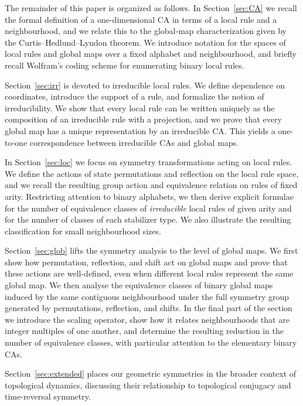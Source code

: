\documentclass[a4paper]{article}
\begin{document}
The remainder of this paper is organized as follows.
In Section~\ref{sec:CA} we recall the formal definition of a one-dimensional CA in terms of
a local rule and a neighbourhood, and we relate this to the global-map
characterization given by the Curtis--Hedlund--Lyndon theorem. We introduce
notation for the spaces of local rules and global maps over a fixed alphabet and
neighbourhood, and briefly recall Wolfram's coding scheme for enumerating
binary local rules.

Section~\ref{sec:irr} is devoted to irreducible local rules. We define dependence on
coordinates, introduce the support of a rule, and formalize the notion of
irreducibility. We show that every local rule can be written uniquely as the
composition of an irreducible rule with a projection, and we prove that every
global map has a unique representation by an irreducible CA. This yields a
one-to-one correspondence between irreducible CAs and global maps.

In Section~\ref{sec:loc} we focus on symmetry transformations acting on local rules. We
define the actions of state permutations and reflection on the local rule space,
and we recall the resulting group action and equivalence relation on rules of
fixed arity. Restricting attention to binary alphabets, we then derive explicit
formulae for the number of equivalence classes of \emph{irreducible} local rules
of given arity and for the number of classes of each stabilizer type. We also
illustrate the resulting classification for small neighbourhood sizes.

Section~\ref{sec:glob} lifts the symmetry analysis to the level of global maps. We first show
how permutation, reflection, and shift act on global maps and prove that these
actions are well-defined, even when different local rules represent the same
global map. We then analyse the equivalence classes of binary global maps
induced by the same contiguous neighbourhood under the full symmetry group
generated by permutations, reflection, and shifts. In the final part of the section
we introduce the scaling operator, show how it relates neighbourhoods that are
integer multiples of one another, and determine the resulting reduction in the
number of equivalence classes, with particular attention to the elementary
binary CAs.

Section~\ref{sec:extended} places our geometric symmetries in the broader context of topological dynamics, discussing their relationship to topological conjugacy and time-reversal symmetry.
\end{document}

